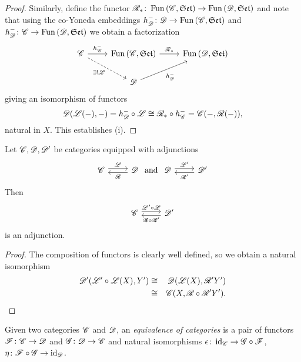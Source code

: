 \documentclass[10pt]{amsart}
\begin{document}
\begin{prop}
\begin{proof}
    Similarly, define the functor $\mathscr{R}_\ast \colon \operatorname{Fun}\left(\mathscr{C}, \mathfrak{Set}\right) \to \operatorname{Fun}\left(\mathscr{D}, \mathfrak{Set}\right)$ and note that using the co-Yoneda embeddings $h^-_{\mathscr{D}} \colon \mathscr{D} \to \operatorname{Fun}\left(\mathscr{C}, \mathfrak{Set}\right)$ and $h^-_{\mathscr{D}} \colon \mathscr{C} \to \operatorname{Fun}\left(\mathscr{D}, \mathfrak{Set}\right)$ we obtain a factorization 
    $$\begin{tikzcd}
      \C \arrow{r}{h^-_\C}\arrow[dashed,swap]{rd}{\exists ! \LA} & \Fun{\C}{\Sets} \arrow{r}{\RA_\ast} & \Fun{\D}{\Sets}\\
      & \D \arrow[swap]{ur}{h^-_{\D}}
    \end{tikzcd}$$
    giving an isomorphism of functors
    $$\mathscr{D}(\mathscr{L}(-), -) = h_{\mathscr{D}}^- \circ \mathscr{L} \cong \mathscr{R}_\ast \circ h_{\mathscr{C}}^- = \mathscr{C}(-, \mathscr{R}( - )),$$
    natural in $X$.
    This establishes (i).
  \end{proof}
\end{prop}

\begin{prop}\label{composeadjunctions}
  Let $\mathscr{C}, \mathscr{D}, \mathscr{D}^\prime$ be categories equipped with adjunctions
  $$\begin{tikzcd}
    \C \arrow[shift left]{r}{\LA} & \D \arrow[shift left]{l}{\RA}
  \end{tikzcd}
  \ \text{and}\ 
  \begin{tikzcd}
    \D \arrow[shift left]{r}{\LA^\prime} & \D^\prime \arrow[shift left]{l}{\RA^\prime}
  \end{tikzcd}$$
  Then 
  $$\begin{tikzcd}
    \C \arrow[shift left]{r}{\LA^\prime \circ \LA} & \D^\prime \arrow[shift left]{l}{\RA \circ \RA^\prime}
  \end{tikzcd}$$
  is an adjunction.

  \begin{proof}
    The composition of functors is clearly well defined, so we obtain a natural isomorphism
    \begin{eqnarray*}
      \mathscr{D}^\prime(\mathscr{L}^\prime \circ \mathscr{L}(X), Y^\prime) &\cong& 
      \mathscr{D}(\mathscr{L}(X), \mathscr{R}^\prime Y^\prime)\\
      &\cong& \mathscr{C}(X, \mathscr{R} \circ \mathscr{R}^\prime Y^\prime).
    \end{eqnarray*}
  \end{proof}
\end{prop}

\begin{defn}
  Given two categories $\mathscr{C}$ and $\mathscr{D}$, an {\it equivalence of categories} is a pair of functors $\mathscr{F} \colon \mathscr{C} \to \mathscr{D}$ and $\mathscr{G} \colon \mathscr{D} \to \mathscr{C}$ and natural isomorphisms $\epsilon \colon \operatorname{id}_{\mathscr{C}} \to \mathscr{G} \circ \mathscr{F}$, $\eta \colon \mathscr{F} \circ \mathscr{G} \to \operatorname{id}_{\mathscr{D}}$.
\end{defn}
\end{document}

